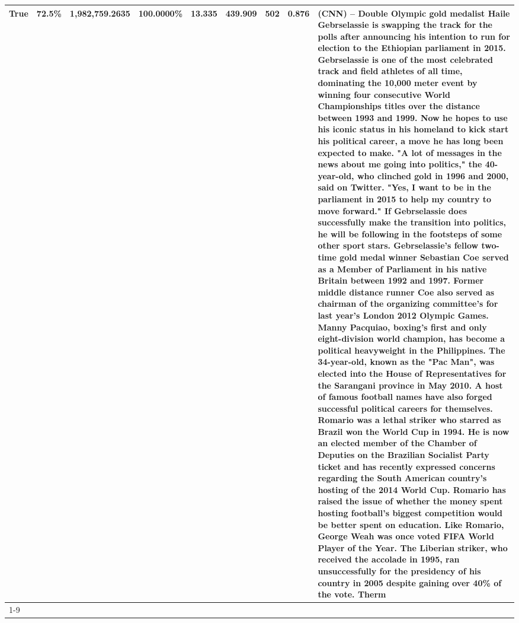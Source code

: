 \begin{table}[H]
{\begin{tabular}{lllrlllll}
True & 72.5\% & 1,982,759.2635 & \bfseries \color{red} 100.0000\% & 13.335 & 439.909 & 502 & 0.876 & (CNN) -- Double Olympic gold medalist Haile Gebrselassie is swapping the track for the polls after announcing his intention to run for election to the Ethiopian parliament in 2015. Gebrselassie is one of the most celebrated track and field athletes of all time, dominating the 10,000 meter event by winning four consecutive World Championships titles over the distance between 1993 and 1999. Now he hopes to use his iconic status in his homeland to kick start his political career, a move he has long been expected to make. "A lot of messages in the news about me going into politics," the 40-year-old, who clinched gold in 1996 and 2000, said on Twitter. "Yes, I want to be in the parliament in 2015 to help my country to move forward." If Gebrselassie does successfully make the transition into politics, he will be following in the footsteps of some other sport stars. Gebrselassie's fellow two-time gold medal winner Sebastian Coe served as a Member of Parliament in his native Britain between 1992 and 1997. Former middle distance runner Coe also served as chairman of the organizing committee's for last year's London 2012 Olympic Games. Manny Pacquiao, boxing's first and only eight-division world champion, has become a political heavyweight in the Philippines. The 34-year-old, known as the "Pac Man", was elected into the House of Representatives for the Sarangani province in May 2010. A host of famous football names have also forged successful political careers for themselves. Romario was a lethal striker who starred as Brazil won the World Cup in 1994. He is now an elected member of the Chamber of Deputies on the Brazilian Socialist Party ticket and has recently expressed concerns regarding the South American country's hosting of the 2014 World Cup. Romario has raised the issue of whether the money spent hosting football's biggest competition would be better spent on education. Like Romario, George Weah was once voted FIFA World Player of the Year. The Liberian striker, who received the accolade in 1995, ran unsuccessfully for the presidency of his country in 2005 despite gaining over 40\% of the vote. Therm \\
\cline{1-9}

\end{tabular}}
\end{table}
